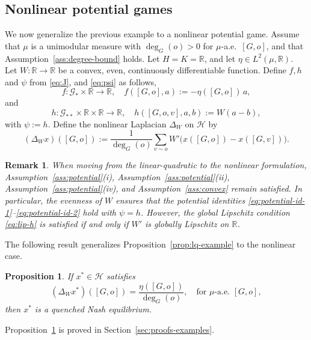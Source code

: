 \documentclass[11pt]{article}
\newtheorem{proposition}[theorem]{Proposition}
\newtheorem{remark}[theorem]{Remark}
\numberwithin{equation}{section}
\begin{document}
\subsection{Nonlinear potential games}

We now generalize the previous example to a nonlinear potential game. Assume that \(\mu\) is a unimodular measure with \(\deg_G(o)>0\) for \(\mu\)-a.e.~$[G,o]$, and that Assumption~\ref{ass:degree-bound} holds. Let \(H=K=\mathbb R\), and let \(\eta\in L^2(\mu,\mathbb R)\). Let \(W:\mathbb R\to\mathbb R\) be a convex, even, continuously differentiable function. Define $f,h$ and $\psi$ from \eqref{eq:J}, and \eqref{eq:psi} as follows, 
\begin{equation}\label{eq:W-f}
f:\mathcal G_\ast\times\mathbb R\to\mathbb R,
\quad
f([G,o],a):=-\eta([G,o])\,a,
\end{equation}
and
\begin{equation}\label{eq:W-h}
h:\mathcal G_{\ast\ast}\times\mathbb R\times\mathbb R\to\mathbb R,
\quad
h([G,o,v],a,b):=W(a-b),
\end{equation}
with $\psi:=h$.
Define the nonlinear Laplacian \(\Delta_W\) on \(\mathcal H\) by 
\begin{equation}\label{eq:W-Delta}
(\Delta_W x)([G,o])
:=
\frac1{\deg_G(o)}
\sum_{v\sim o}W'\!\big(x([G,o])-x([G,v])\big).
\end{equation}
\begin{remark}
When moving from the linear-quadratic to the nonlinear formulation, Assumption~\ref{ass:potential}(i), Assumption~\ref{ass:potential}(ii), Assumption~\ref{ass:potential}(iv), and Assumption~\ref{ass:convex} remain satisfied. In particular, the evenness of $W$ ensures that the potential identities \eqref{eq:potential-id-1}--\eqref{eq:potential-id-2} hold with $\psi=h$. However, the global Lipschitz condition \eqref{eq:lip-h} is satisfied if and only if \(W'\) is globally Lipschitz on \(\mathbb R\).
\end{remark}
The following result generalizes Proposition~\ref{prop:lq-example} to the nonlinear case.
\begin{proposition}\label{prop:W-example}
If \(x^\ast\in\mathcal H\) satisfies
\begin{equation}\label{eq:W-poisson}
(\Delta_W x^\ast)([G,o])=\frac{\eta([G,o])}{\deg_G(o)},
\quad \text{for } \mu\text{-a.e. } [G,o],
\end{equation}
then \(x^\ast\) is a quenched Nash equilibrium.
\end{proposition}
Proposition~\ref{prop:W-example} is proved in Section~\ref{sec:proofs-examples}.
\end{document}

